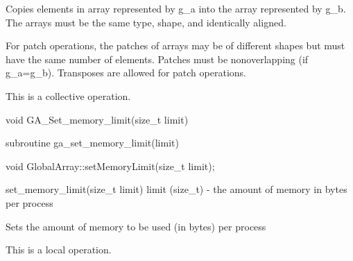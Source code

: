 \documentclass[12pt]{article}
\begin{document}
\begin{desc}

Copies elements in array represented by g_a into the array represented by g_b.
The arrays must be the same type, shape, and identically aligned.

For patch operations, the patches of arrays may be of different shapes but must
have the same number of elements. Patches must be nonoverlapping (if g_a=g_b). 
Transposes are allowed for patch operations.

This is a collective operation.

\end{desc}


\begin{capi}
\begin{ccode}
void GA_Set_memory_limit(size_t limit)
\end{ccode}
\begin{funcargs}
\end{funcargs}
\end{capi}
\begin{fapi}
\begin{fcode}
subroutine ga_set_memory_limit(limit)
\end{fcode}
\begin{funcargs}
\end{funcargs}
\end{fapi}

\begin{cxxapi}
\begin{cxxcode}
void GlobalArray::setMemoryLimit(size_t limit);
\end{cxxcode}
\begin{funcargs}
\end{funcargs}
\end{cxxapi}

\begin{pyapi}
\begin{pycode}
set_memory_limit(size_t limit)
   limit (size_t) - the amount of memory in bytes per process 
\end{pycode}
\end{pyapi}

\begin{desc}

Sets the amount of memory to be used (in bytes) per process

This is a local operation.

\end{desc}
\end{document}
